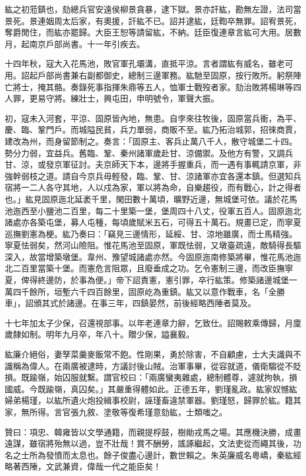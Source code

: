 \begin{pinyinscope}
紘之初蒞鎮也，劾總兵官安遠侯柳景貪暴，逮下獄。景亦訐紘，勘無左證，法司當景死。景連姻周太后家，有奧援，訐紘不已。詔并逮紘，廷鞫卒無罪。詔宥景死，奪爵閒住，而紘亦罷歸。大臣王恕等請留紘，不納。廷臣復連章言紘可大用。居數月，起南京戶部尚書。十一年引疾去。

十四年秋，寇大入花馬池，敗官軍孔壩溝，直抵平涼。言者謂紘有威名，雖老可用。詔起戶部尚書兼右副都御史，總制三邊軍務。紘馳至固原，按行敗所。躬祭陣亡將士，掩其骼。奏錄死事指揮朱鼎等五人，恤軍士戰歿者家。劾治敗將楊琳等四人罪，更易守將。練壯士，興屯田，申明號令，軍聲大振。

初，寇未入河套，平涼、固原皆內地，無患。自孛來往牧後，固原當兵衝，為平、慶、臨、鞏門戶。而城隘民貧，兵力單弱，商販不至。紘乃拓治城郭，招徠商賈，建改為州，而身留節制之。奏言：「固原主、客兵止萬八千人，散守城堡二十四。勢分力弱，宜益兵。舊臨、鞏、秦州諸軍歲赴甘、涼備禦。及他方有警，又調兵甘、涼，或發京軍征討。夫京師天下本，邊將手握重兵，而一遇有事輒請京軍，非強幹弱枝之道。請自今京兵毋輕發，臨、鞏、甘、涼諸軍亦宜各還本鎮。但選知兵宿將一二人各守其地，人以戍為家，軍以將為命，自樂趨役，而有戰心，計之得者也。」紘見固原迤北延袤千里，閑田數十萬頃，曠野近邊，無城堡可依。議於花馬池迤西至小鹽池二百里，每二十里築一堡，堡周四十八丈，役軍五百人。固原迤北諸處亦各築屯堡，募人屯種，每頃歲賦米五石，可得五十萬石。規畫已定，而寧夏巡撫劉憲為梗。紘乃奏曰：「竊見三邊情形，延綏、甘、涼地雖廣，而士馬精強。寧夏怯弱矣，然河山險阻。惟花馬池至固原，軍既怯弱，又墩臺疏遠，敵騎得長驅深入，故當增築墩堡。韋州、豫望城諸處亦然。今固原迤南修築將畢，惟花馬池迤北二百里當築十堡。而憲危言阻眾，且廢垂成之功。乞令憲制三邊，而改臣撫寧夏，俾得終邊防，於事為便。」帝下詔責憲，憲引罪，卒行紘策。修築諸邊城堡一萬四千餘所，垣塹六千四百餘里，固原屹為重鎮。紘又以意作戰車，名「全勝車」，詔頒其式於諸邊。在事三年，四鎮晏然，前後經略西陲者莫及。

十七年加太子少保，召還視部事。以年老連章力辭，乞致仕。詔賜敕乘傳歸，月廩歲隸如制。明年九月卒，年八十。贈少保，謚襄毅。

紘廉介絕俗，妻孥菜羹麥飯常不飽。性剛果，勇於除害，不自顧慮，士大夫識與不識稱為偉人。在兩廣被逮時，方議討後山賊。治軍事畢，從容就道，儀衛騶從不貶損。既踰嶺，始囚服就繫。謂官校曰：「兩廣蠻夷雜處，總制體尊，遽就拘執，損國威。今既踰嶺，真囚矣。」其嚴重得體如此。正德五年，劉瑾亂政。紘家奴憾紘婦弟楊瑾，以紘所遺火炮投緝事校尉，誣瑾畜違禁軍器。劉瑾怒，歸罪於紘。籍其家，無所得。言官張九敘、塗敬等復希瑾意劾紘，士類嗤之。

贊曰：項忠、韓雍皆以文學通籍，而親提桴鼓，樹勛戎馬之場。其應機決勝，成畫遠謀，雖宿將殆無以過，豈不壯哉！賞不酬勞，謠諑繼起，文法吏從而繩其後，功名之士所為發憤而太息也。餘子俊盡心邊計，數世賴之。朱英廉威名粵嶠，秦紘經略著西陲，文武兼資，偉哉一代之能臣矣！


\end{pinyinscope}